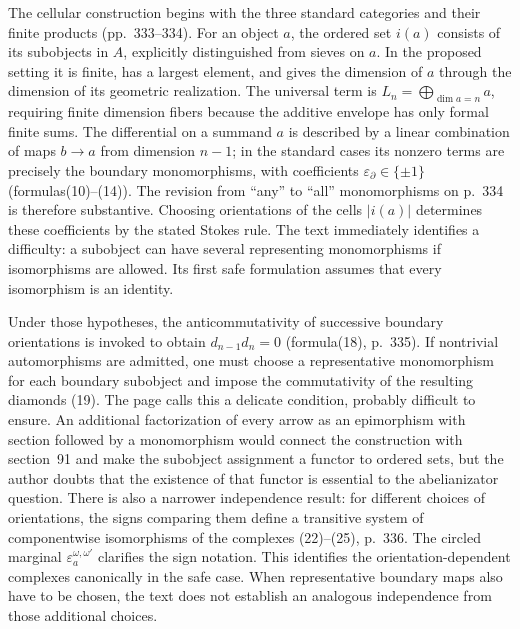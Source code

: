 The cellular construction begins with the three standard categories and their finite products (pp.~333--334). For an object $a$, the ordered set $i(a)$ consists of its subobjects in $A$, explicitly distinguished from sieves on $a$. In the proposed setting it is finite, has a largest element, and gives the dimension of $a$ through the dimension of its geometric realization. The universal term is $L_n=\bigoplus_{\dim a=n}a$, requiring finite dimension fibers because the additive envelope has only formal finite sums. The differential on a summand $a$ is described by a linear combination of maps $b\to a$ from dimension $n-1$; in the standard cases its nonzero terms are precisely the boundary monomorphisms, with coefficients $\varepsilon_{\partial}\in\{\pm1\}$ (formulas(10)--(14)). The revision from ``any'' to ``all'' monomorphisms on p.~334 is therefore substantive. Choosing orientations of the cells $|i(a)|$ determines these coefficients by the stated Stokes rule. The text immediately identifies a difficulty: a subobject can have several representing monomorphisms if isomorphisms are allowed. Its first safe formulation assumes that every isomorphism is an identity.

Under those hypotheses, the anticommutativity of successive boundary orientations is invoked to obtain $d_{n-1}d_n=0$ (formula(18), p.~335). If nontrivial automorphisms are admitted, one must choose a representative monomorphism for each boundary subobject and impose the commutativity of the resulting diamonds (19). The page calls this a delicate condition, probably difficult to ensure. An additional factorization of every arrow as an epimorphism with section followed by a monomorphism would connect the construction with section~91 and make the subobject assignment a functor to ordered sets, but the author doubts that the existence of that functor is essential to the abelianizator question. There is also a narrower independence result: for different choices of orientations, the signs comparing them define a transitive system of componentwise isomorphisms of the complexes (22)--(25), p.~336. The circled marginal $\varepsilon_a^{\omega,\omega'}$ clarifies the sign notation. This identifies the orientation-dependent complexes canonically in the safe case. When representative boundary maps also have to be chosen, the text does not establish an analogous independence from those additional choices.

